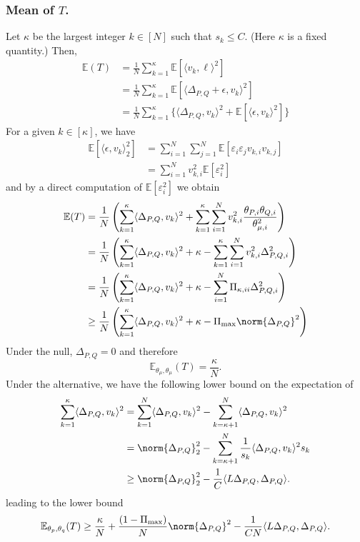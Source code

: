 \documentclass{article}
\newcommand{\dotp}[2]{\langle #1, #2 \rangle}
\newcommand{\1}{\mathbf{1}}
\newcommand{\Ebb}{\mathbb{E}}
\theoremstyle{alden}
\theoremstyle{aldenthm}
\theoremstyle{definition}
\theoremstyle{remark}
\begin{document}
\subsubsection{Mean of $T$.}
Let $\kappa$ be the largest integer $k \in [N]$ such that $s_k \leq C$. (Here $\kappa$ is a fixed quantity.) Then,
\begin{align*}
\Ebb(T) & = \frac{1}{N}\sum_{k = 1}^{\kappa} \Ebb\left[\dotp{v_k}{\ell}^2\right] \\
& = \frac{1}{N}\sum_{k = 1}^{\kappa} \Ebb\left[\dotp{\Delta_{P,Q} + \epsilon}{v_k}^2\right] \\
& = \frac{1}{N}\sum_{k = 1}^{\kappa} \bigl\{\dotp{\Delta_{P,Q}}{v_k}^2 + \Ebb\left[\dotp{\epsilon}{v_k}^2\right]\bigr\}
\end{align*}
For a given $k \in [\kappa]$, we have
\begin{align*}
\Ebb\left[\dotp{\epsilon}{v_k}_2^2\right] & = \sum_{i = 1}^{N} \sum_{j = 1}^N \Ebb\left[\varepsilon_i \varepsilon_j v_{k,i} v_{k,j}\right] \\
& = \sum_{i = 1}^{N} v_{k,i}^2 \Ebb\left[\varepsilon_i^2 \right]
\end{align*}
and by a direct computation of $\Ebb\left[\varepsilon_i^2 \right]$ we obtain
\begin{align*}
\mathbb{E}(T) & = \frac{1}{N}\left(\sum_{k = 1}^{\kappa} \dotp{\Delta_{P,Q}}{v_k}^2 + \sum_{k = 1}^{\kappa} \sum_{i = 1}^{N} v_{k,i}^2 \frac{\theta_{P,i} \theta_{Q,i}}{\theta_{\mu,i}^2}\right) \\
& = \frac{1}{N}\left(\sum_{k = 1}^{\kappa} \dotp{\Delta_{P,Q}}{v_k}^2 + \kappa - \sum_{k = 1}^{\kappa} \sum_{i = 1}^{N} v_{k,i}^2 \Delta_{P,Q,i}^2\right) \\
& = \frac{1}{N}\left(\sum_{k = 1}^{\kappa} \dotp{\Delta_{P,Q}}{v_k}^2 + \kappa - \sum_{i = 1}^{N} \Pi_{\kappa,ii} \Delta_{P,Q,i}^2\right) \\
& \geq \frac{1}{N}\left(\sum_{k = 1}^{\kappa} \dotp{\Delta_{P,Q}}{v_k}^2 + \kappa - \Pi_{\max} \norm{\Delta_{P,Q}}^2\right)
\end{align*}
Under the null, $\Delta_{P,Q} = 0$ and therefore
\begin{equation}
\label{eqn:mean_null}
\mathbb{E}_{\theta_{\mu},\theta_{\mu}}(T) = \frac{\kappa}{N}.
\end{equation}
Under the alternative, we have the following lower bound on the expectation of 
\begin{align*}
\sum_{k = 1}^{\kappa} \dotp{\Delta_{P,Q}}{v_k}^2 & = \sum_{k = 1}^{N} \dotp{\Delta_{P,Q}}{v_k}^2  - \sum_{k = \kappa + 1}^{N} \dotp{\Delta_{P,Q}}{v_k}^2 \\
& = \norm{\Delta_{P,Q}}_2^2 - \sum_{k = \kappa + 1}^{N} \frac{1}{s_k}\dotp{\Delta_{P,Q}}{v_k}^2 s_k \\
& \geq \norm{\Delta_{P,Q}}_2^2 - \frac{1}{C} \dotp{L\Delta_{P,Q}}{\Delta_{P,Q}}.
\end{align*}
leading to the lower bound
\begin{equation}
\label{eqn:mean_alternative}
\mathbb{E}_{\theta_p,\theta_q}(T) \geq \frac{\kappa}{N} + \frac{(1 - \Pi_{\max})}{N}\norm{\Delta_{P,Q}}^2 - \frac{1}{CN} \dotp{L\Delta_{P,Q}}{\Delta_{P,Q}}.
\end{equation}
\end{document}
